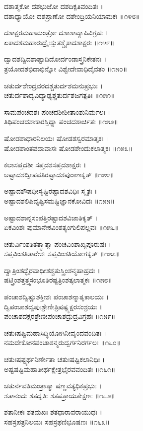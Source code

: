 ದಶಾತ್ಮಕೋ ದಶಭುಜೋ ದಶದಿಕ್ಪತಿವಂದಿತಃ ।\\
ದಶಾಧ್ಯಾಯೋ ದಶಪ್ರಾಣೋ ದಶೇಂದ್ರಿಯನಿಯಾಮಕಃ ॥೧೪೮॥

ದಶಾಕ್ಷರಮಹಾಮಂತ್ರೋ ದಶಾಶಾವ್ಯಾಪಿವಿಗ್ರಹಃ ।\\
ಏಕಾದಶಮಹಾರುದ್ರೈಃಸ್ತುತಶ್ಚೈಕಾದಶಾಕ್ಷರಃ ॥೧೪೯॥

ದ್ವಾದಶದ್ವಿದಶಾಷ್ಟಾದಿದೋರ್ದಂಡಾಸ್ತ್ರನಿಕೇತನಃ ।\\
ತ್ರಯೋದಶಭಿದಾಭಿನ್ನೋ ವಿಶ್ವೇದೇವಾಧಿದೈವತಂ ॥೧೫೦॥

ಚತುರ್ದಶೇಂದ್ರವರದಶ್ಚತುರ್ದಶಮನುಪ್ರಭುಃ ।\\
ಚತುರ್ದಶಾದ್ಯವಿದ್ಯಾಢ್ಯಶ್ಚತುರ್ದಶಜಗತ್ಪತಿಃ ॥೧೫೧॥

ಸಾಮಪಂಚದಶಃ ಪಂಚದಶೀಶೀತಾಂಶುನಿರ್ಮಲಃ ।\\
ತಿಥಿಪಂಚದಶಾಕಾರಸ್ತಿಥ್ಯಾ ಪಂಚದಶಾರ್ಚಿತಃ ॥೧೫೨॥

ಷೋಡಶಾಧಾರನಿಲಯಃ ಷೋಡಶಸ್ವರಮಾತೃಕಃ ।\\
ಷೋಡಶಾಂತಪದಾವಾಸಃ ಷೋಡಶೇಂದುಕಲಾತ್ಮಕಃ ॥೧೫೩॥

ಕಲಾಸಪ್ತದಶೀ ಸಪ್ತದಶಸಪ್ತದಶಾಕ್ಷರಃ ।\\
ಅಷ್ಟಾದಶದ್ವೀಪಪತಿರಷ್ಟಾದಶಪುರಾಣಕೃತ್ ॥೧೫೪॥

ಅಷ್ಟಾದಶೌಷಧೀಸೃಷ್ಟಿರಷ್ಟಾದಶವಿಧಿಃ ಸ್ಮೃತಃ ।\\
ಅಷ್ಟಾದಶಲಿಪಿವ್ಯಷ್ಟಿಸಮಷ್ಟಿಜ್ಞಾನಕೋವಿದಃ ॥೧೫೫॥

ಅಷ್ಟಾದಶಾನ್ನಸಂಪತ್ತಿರಷ್ಟಾದಶವಿಜಾತಿಕೃತ್ ।\\
ಏಕವಿಂಶಃ ಪುಮಾನೇಕವಿಂಶತ್ಯಂಗುಲಿಪಲ್ಲವಃ ॥೧೫೬॥

ಚತುರ್ವಿಂಶತಿತತ್ತ್ವಾತ್ಮಾ ಪಂಚವಿಂಶಾಖ್ಯಪೂರುಷಃ ।\\
ಸಪ್ತವಿಂಶತಿತಾರೇಶಃ ಸಪ್ತವಿಂಶತಿಯೋಗಕೃತ್ ॥೧೫೭॥

ದ್ವಾತ್ರಿಂಶದ್ಭೈರವಾಧೀಶಶ್ಚತುಸ್ತ್ರಿಂಶನ್ಮಹಾಹ್ರದಃ ।\\
ಷಟ್ತ್ರಿಂಶತ್ತತ್ತ್ವಸಂಭೂತಿರಷ್ಟತ್ರಿಂಶತ್ಕಲಾತ್ಮಕಃ ॥೧೫೮॥

ಪಂಚಾಶದ್ವಿಷ್ಣುಶಕ್ತೀಶಃ ಪಂಚಾಶನ್ಮಾತೃಕಾಲಯಃ ।\\
ದ್ವಿಪಂಚಾಶದ್ವಪುಃಶ್ರೇಣೀತ್ರಿಷಷ್ಟ್ಯಕ್ಷರಸಂಶ್ರಯಃ ।\\
ಪಂಚಾಶದಕ್ಷರಶ್ರೇಣೀಪಂಚಾಶದ್ರುದ್ರವಿಗ್ರಹಃ ॥೧೫೯॥

ಚತುಃಷಷ್ಟಿಮಹಾಸಿದ್ಧಿಯೋಗಿನೀವೃಂದವಂದಿತಃ ।\\
ನಮದೇಕೋನಪಂಚಾಶನ್ಮರುದ್ವರ್ಗನಿರರ್ಗಲಃ ॥೧೬೦॥

ಚತುಃಷಷ್ಟ್ಯರ್ಥನಿರ್ಣೇತಾ ಚತುಃಷಷ್ಟಿಕಲಾನಿಧಿಃ ।\\
ಅಷ್ಟಷಷ್ಟಿಮಹಾತೀರ್ಥಕ್ಷೇತ್ರಭೈರವವಂದಿತಃ ॥೧೬೧॥

ಚತುರ್ನವತಿಮಂತ್ರಾತ್ಮಾ ಷಣ್ಣವತ್ಯಧಿಕಪ್ರಭುಃ ।\\
ಶತಾನಂದಃ ಶತಧೃತಿಃ ಶತಪತ್ರಾಯತೇಕ್ಷಣಃ ॥೧೬೨॥

ಶತಾನೀಕಃ ಶತಮಖಃ ಶತಧಾರಾವರಾಯುಧಃ ।\\
ಸಹಸ್ರಪತ್ರನಿಲಯಃ ಸಹಸ್ರಫಣಿಭೂಷಣಃ ॥೧೬೩॥

